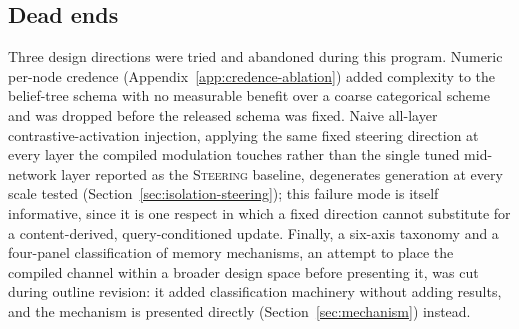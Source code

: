 \subsection{Dead ends}
\label{app:deadends}

Three design directions were tried and abandoned during this program. Numeric
per-node credence (Appendix~\ref{app:credence-ablation}) added complexity to the
belief-tree schema with no measurable benefit over a coarse categorical scheme and was
dropped before the released schema was fixed. Naive all-layer contrastive-activation
injection, applying the same fixed steering direction at every layer the compiled
modulation touches rather than the single tuned mid-network layer reported as the
\textsc{Steering} baseline, degenerates generation at every scale tested
(Section~\ref{sec:isolation-steering}); this failure mode is itself informative, since
it is one respect in which a fixed direction cannot substitute for a content-derived,
query-conditioned update. Finally, a six-axis taxonomy and a four-panel classification of
memory mechanisms, an attempt to place the compiled channel within a broader design
space before presenting it, was cut during outline revision: it added classification
machinery without adding results, and the mechanism is presented directly
(Section~\ref{sec:mechanism}) instead.
